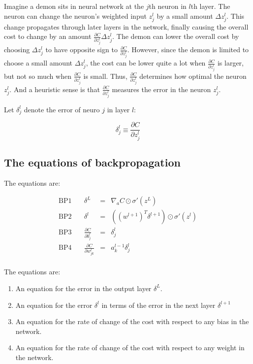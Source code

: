 \documentclass[]{book}
\begin{document}
Imagine a demon sits in neural network at the \(j\)th neuron in \(l\)th
layer. The neuron can change the neuron's weighted input \(z^l_j\) by a
small amount \(\Delta z^l_j\). This change propagates through later
layers in the network, finally causing the overall cost to change by an
amount \(\frac{\partial C}{\partial z^l_j} \Delta z^l_j\). The demon can
lower the overall cost by choosing \(\Delta z^l_j\) to have opposite
sign to \(\frac{\partial C}{\partial z^l_j}\). However, since the demon
is limited to choose a small amount \(\Delta z^l_j\), the cost can be
lower quite a lot when \(\frac{\partial C}{\partial z^l_j}\) is larger,
but not so much when \(\frac{\partial C}{\partial z^l_j}\) is small.
Thus, \(\frac{\partial C}{\partial z^l_j}\) determines how optimal the
neuron \(z^l_j\). And a heuristic sense is that
\(\frac{\partial C}{\partial z^l_j}\) measures the error in the neuron
\(z^l_j\).

Let \(\delta^l_j\) denote the error of neuro \(j\) in layer \(l\):

\begin{equation}
\delta^l_j \equiv \frac{\partial C}{\partial z^l_j}
\end{equation}

\subsection{The equations of
backpropagation}\label{the-equations-of-backpropagation}

The equations are:

\begin{equation}
\begin{array}{cccl}
\mbox{BP1} \quad & \delta^L & = & \nabla_a C \odot \sigma'(z^L) \\
\mbox{BP2} \quad & \delta^l & = & ((w^{l+1})^T \delta^{l+1}) \odot \sigma'(z^l) \\
\mbox{BP3} \quad & \displaystyle \frac{\partial C}{\partial b^l_j} & = & \delta^l_j \\
\mbox{BP4} \quad & \displaystyle \frac{\partial C}{\partial w^l_{jk}} & = & a^{l-1}_k \delta^l_j \\
\end{array}
\end{equation}

The equations are:

\begin{enumerate}
\def\labelenumi{\arabic{enumi}.}
\item
  An equation for the error in the output layer \(\delta^L\).
\item
  An equation for the error \(\delta^l\) in terms of the error in the
  next layer \(\delta^{l+1}\)
\item
  An equation for the rate of change of the cost with respect to any
  bias in the network.
\item
  An equation for the rate of change of the cost with respect to any
  weight in the network.
\end{enumerate}
\end{document}

